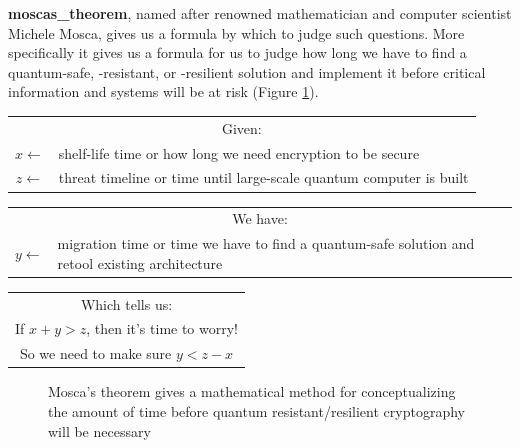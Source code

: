 \textbf{\gls{moscas_theorem}}, named after renowned mathematician and computer scientist Michele Mosca, gives us a formula by which to judge such questions. More specifically it gives us a formula for us to judge how long we have to find a quantum-safe, -resistant, or -resilient solution and implement it before critical information and systems will be at risk (Figure \ref{fig:moscas_theorem}). \\

    \begin{table}[h]
        \centering
        \begin{tabular}{cl}
     \multicolumn{2}{c}{Given:}\\
             $x \leftarrow$& shelf-life time or how long we need encryption to be secure\\
             $z \leftarrow$& threat timeline or time until large-scale quantum computer is built\\
        \end{tabular}
        \label{tab:mosca_given}
    \end{table}
    
    \begin{table}[h]
        \centering
        \begin{tabular}{cl}
     \multicolumn{2}{c}{We have:}\\
             $y \leftarrow$& migration time or time we have to find a quantum-safe solution and retool existing architecture\\
        \end{tabular}
        \label{tab:mosca_wehave}
    \end{table}
    
    \begin{table}[h]
        \centering
        \begin{tabular}{cl}
     \multicolumn{2}{c}{Which tells us:}\\
             \multicolumn{2}{c}{If $x+y>z$, then it's time to worry!}\\
 \multicolumn{2}{c}{So we need to make sure $y < z-x$}\\
        \end{tabular}
        \label{tab:mosca_worry}
    \end{table}
    
    \begin{figure}[!h]
        \centering
        {
            \captionsetup{justification=centering}
            \caption{Mosca's theorem gives a mathematical method for conceptualizing the amount of time before quantum resistant/resilient cryptography will be necessary}
            \label{fig:moscas_theorem}
        }
    \end{figure}
    
